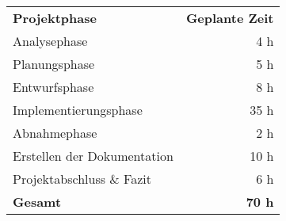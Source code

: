 \begin{tabular}{lr}
\rowcolor{heading}\textbf{Projektphase} & \textbf{Geplante Zeit} \\
Analysephase & 4 h \\
\rowcolor{odd}Planungsphase & 5 h \\
Entwurfsphase & 8 h \\
\rowcolor{odd}Implementierungsphase & 35 h \\
Abnahmephase & 2 h \\
\rowcolor{odd}Erstellen der Dokumentation & 10 h \\
Projektabschluss \& Fazit & 6 h \\

\hline
\hline
\rowcolor{odd}\textbf{Gesamt} & \textbf{70 h} \\
\end{tabular}
